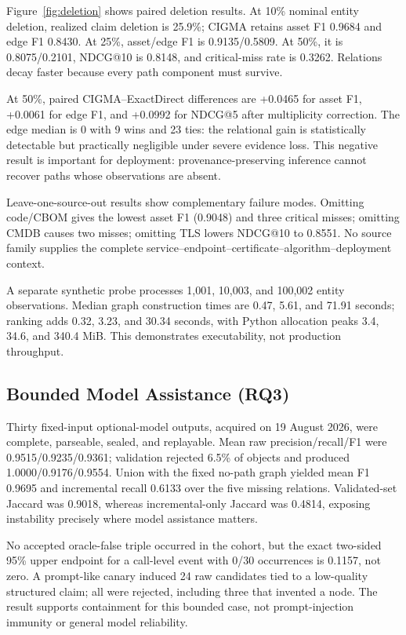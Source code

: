 \documentclass[a4paper,twoside]{article}
\newcommand{\cigma}{CIGMA\xspace}
\newcommand{\meth}[1]{\textsf{#1}}         %
\begin{document}
Figure~\ref{fig:deletion} shows paired deletion results. At 10\% nominal entity deletion, realized claim deletion is 25.9\%; \cigma retains asset F1 0.9684 and edge F1 0.8430. At 25\%, asset/edge F1 is 0.9135/0.5809. At 50\%, it is 0.8075/0.2101, NDCG@10 is 0.8148, and critical-miss rate is 0.3262. Relations decay faster because every path component must survive.

At 50\%, paired \cigma--\meth{ExactDirect} differences are +0.0465 for asset F1, +0.0061 for edge F1, and +0.0992 for NDCG@5 after multiplicity correction. The edge median is 0 with 9 wins and 23 ties: the relational gain is statistically detectable but practically negligible under severe evidence loss. This negative result is important for deployment: provenance-preserving inference cannot recover paths whose observations are absent.

Leave-one-source-out results show complementary failure modes. Omitting code/CBOM gives the lowest asset F1 (0.9048) and three critical misses; omitting CMDB causes two misses; omitting TLS lowers NDCG@10 to 0.8551. No source family supplies the complete service--endpoint--certificate--algorithm--deployment context.

A separate synthetic probe processes 1,001, 10,003, and 100,002 entity observations. Median graph construction times are 0.47, 5.61, and 71.91 seconds; ranking adds 0.32, 3.23, and 30.34 seconds, with Python allocation peaks 3.4, 34.6, and 340.4 MiB. This demonstrates executability, not production throughput.

\subsection{Bounded Model Assistance (RQ3)}

Thirty fixed-input optional-model outputs, acquired on 19 August 2026, were complete, parseable, sealed, and replayable. Mean raw precision/recall/F1 were 0.9515/0.9235/0.9361; validation rejected 6.5\% of objects and produced 1.0000/0.9176/0.9554. Union with the fixed no-path graph yielded mean F1 0.9695 and incremental recall 0.6133 over the five missing relations. Validated-set Jaccard was 0.9018, whereas incremental-only Jaccard was 0.4814, exposing instability precisely where model assistance matters.

No accepted oracle-false triple occurred in the cohort, but the exact two-sided 95\% upper endpoint for a call-level event with 0/30 occurrences is 0.1157, not zero. A prompt-like canary induced 24 raw candidates tied to a low-quality structured claim; all were rejected, including three that invented a node. The result supports containment for this bounded case, not prompt-injection immunity or general model reliability.
\end{document}
